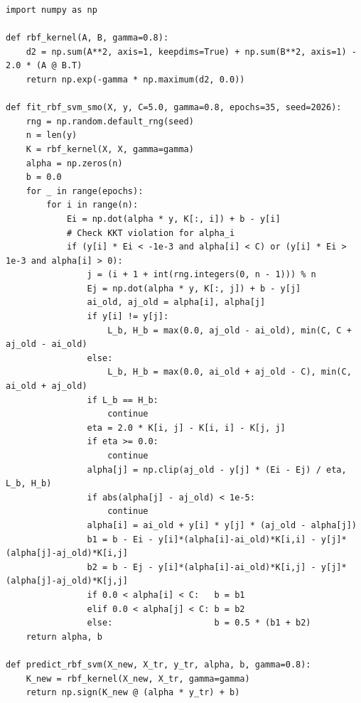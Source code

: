\begin{lstlisting}[caption={纯 NumPy 对偶 RBF-SVM 与简化 SMO 坐标上升求解器（复现表~\ref{tab:svm-circles}）},label={lst:svm-smo}]
import numpy as np

def rbf_kernel(A, B, gamma=0.8):
    d2 = np.sum(A**2, axis=1, keepdims=True) + np.sum(B**2, axis=1) - 2.0 * (A @ B.T)
    return np.exp(-gamma * np.maximum(d2, 0.0))

def fit_rbf_svm_smo(X, y, C=5.0, gamma=0.8, epochs=35, seed=2026):
    rng = np.random.default_rng(seed)
    n = len(y)
    K = rbf_kernel(X, X, gamma=gamma)
    alpha = np.zeros(n)
    b = 0.0
    for _ in range(epochs):
        for i in range(n):
            Ei = np.dot(alpha * y, K[:, i]) + b - y[i]
            # Check KKT violation for alpha_i
            if (y[i] * Ei < -1e-3 and alpha[i] < C) or (y[i] * Ei > 1e-3 and alpha[i] > 0):
                j = (i + 1 + int(rng.integers(0, n - 1))) % n
                Ej = np.dot(alpha * y, K[:, j]) + b - y[j]
                ai_old, aj_old = alpha[i], alpha[j]
                if y[i] != y[j]:
                    L_b, H_b = max(0.0, aj_old - ai_old), min(C, C + aj_old - ai_old)
                else:
                    L_b, H_b = max(0.0, ai_old + aj_old - C), min(C, ai_old + aj_old)
                if L_b == H_b:
                    continue
                eta = 2.0 * K[i, j] - K[i, i] - K[j, j]
                if eta >= 0.0:
                    continue
                alpha[j] = np.clip(aj_old - y[j] * (Ei - Ej) / eta, L_b, H_b)
                if abs(alpha[j] - aj_old) < 1e-5:
                    continue
                alpha[i] = ai_old + y[i] * y[j] * (aj_old - alpha[j])
                b1 = b - Ei - y[i]*(alpha[i]-ai_old)*K[i,i] - y[j]*(alpha[j]-aj_old)*K[i,j]
                b2 = b - Ej - y[i]*(alpha[i]-ai_old)*K[i,j] - y[j]*(alpha[j]-aj_old)*K[j,j]
                if 0.0 < alpha[i] < C:   b = b1
                elif 0.0 < alpha[j] < C: b = b2
                else:                    b = 0.5 * (b1 + b2)
    return alpha, b

def predict_rbf_svm(X_new, X_tr, y_tr, alpha, b, gamma=0.8):
    K_new = rbf_kernel(X_new, X_tr, gamma=gamma)
    return np.sign(K_new @ (alpha * y_tr) + b)
\end{lstlisting}

